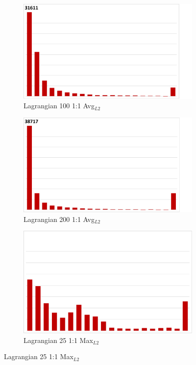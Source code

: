 \begin{figure}
\begin{subfigure}{0.24\textwidth}
\end{subfigure}
\hspace{1mm}
\begin{subfigure}{0.24\textwidth}
\centering
\includegraphics[width=0.7\linewidth, trim={0cm 0cm 2.5cm 0cm}, clip]{results/nyx/Lag100_1_AvgL2.pdf}
\caption{Lagrangian 100 1:1 Avg$_{L2}$}
\end{subfigure}
\hspace{1mm}
\begin{subfigure}{0.24\textwidth}
\centering
\includegraphics[width=0.7\linewidth, trim={0cm 0cm 2.5cm 0cm}, clip]{results/nyx/Lag200_1_AvgL2.pdf}
\caption{Lagrangian 200 1:1 Avg$_{L2}$}
\end{subfigure}
\hspace{1mm}
\begin{subfigure}{0.24\textwidth}
\centering
\includegraphics[width=0.7\linewidth]{results/nyx/Lag25_1_Max.pdf}
\caption{Lagrangian 25 1:1 Max$_{L2}$}
\end{subfigure}

\end{figure}
